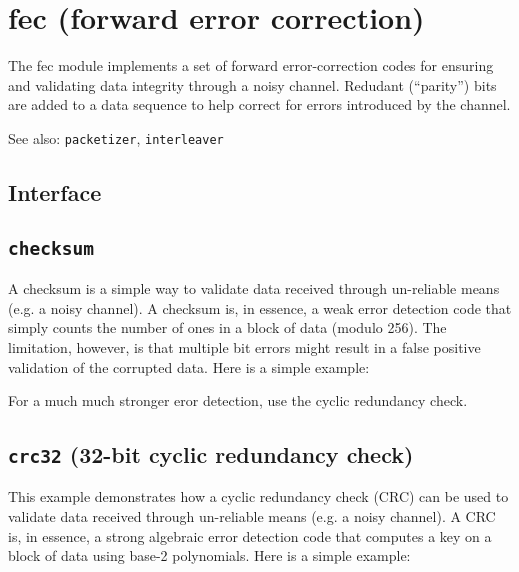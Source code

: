 % 
%

\section{fec (forward error correction)}
\label{module:fec}
The fec module implements a set of forward error-correction codes for
ensuring and validating data integrity through a noisy channel.
Redudant (``parity'') bits are added to a data sequence to help correct for
errors introduced by the channel.

See also: {\tt packetizer}, {\tt interleaver}

\subsection{Interface}
\label{module:fec:interface}

\subsection{{\tt checksum}}
\label{module:fec:checksum}
A checksum is a simple way to validate data received through un-reliable means
(e.g. a noisy channel).
A checksum is, in essence, a weak error detection code that simply counts the
number of ones in a block of data (modulo 256).
The limitation, however, is that multiple bit errors might result in a false
positive validation of the corrupted data.
Here is a simple example:
%

%
For a much much stronger eror detection, use the cyclic redundancy check.

\subsection{{\tt crc32} (32-bit cyclic redundancy check)}
\label{module:fec:crc32}
This example demonstrates how a cyclic redundancy check (CRC) can be used to
validate data received through un-reliable means (e.g. a noisy channel).
A CRC is, in essence, a strong algebraic error detection code that computes a
key on a block of data using base-2 polynomials.
Here is a simple example:
%


